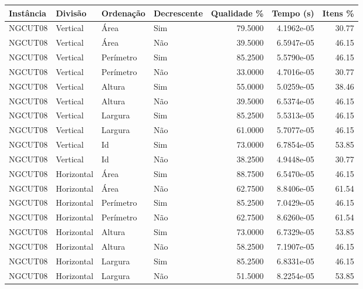 \begin{tabular}{llllrrr}
    \hline
    Instância & Divisão     & Ordenação & Decrescente & Qualidade \% & Tempo (s)  & Itens \% \\
    \hline
    NGCUT08   & Vertical    & Área      & Sim         & 79.5000      & 4.1962e-05 & 30.77    \\
    NGCUT08   & Vertical    & Área      & Não         & 39.5000      & 6.5947e-05 & 46.15    \\
    NGCUT08   & Vertical    & Perímetro & Sim         & 85.2500      & 5.5790e-05 & 46.15    \\
    NGCUT08   & Vertical    & Perímetro & Não         & 33.0000      & 4.7016e-05 & 30.77    \\
    NGCUT08   & Vertical    & Altura    & Sim         & 55.0000      & 5.0259e-05 & 38.46    \\
    NGCUT08   & Vertical    & Altura    & Não         & 39.5000      & 6.5374e-05 & 46.15    \\
    NGCUT08   & Vertical    & Largura   & Sim         & 85.2500      & 5.5313e-05 & 46.15    \\
    NGCUT08   & Vertical    & Largura   & Não         & 61.0000      & 5.7077e-05 & 46.15    \\
    NGCUT08   & Vertical    & Id        & Sim         & 73.0000      & 6.7854e-05 & 53.85    \\
    NGCUT08   & Vertical    & Id        & Não         & 38.2500      & 4.9448e-05 & 30.77    \\
    NGCUT08   & Horizontal  & Área      & Sim         & 88.7500      & 6.5470e-05 & 46.15    \\
    NGCUT08   & Horizontal  & Área      & Não         & 62.7500      & 8.8406e-05 & 61.54    \\
    NGCUT08   & Horizontal  & Perímetro & Sim         & 85.2500      & 7.0429e-05 & 46.15    \\
    NGCUT08   & Horizontal  & Perímetro & Não         & 62.7500      & 8.6260e-05 & 61.54    \\
    NGCUT08   & Horizontal  & Altura    & Sim         & 73.0000      & 6.7329e-05 & 53.85    \\
    NGCUT08   & Horizontal  & Altura    & Não         & 58.2500      & 7.1907e-05 & 46.15    \\
    NGCUT08   & Horizontal  & Largura   & Sim         & 85.2500      & 6.8331e-05 & 46.15    \\
    NGCUT08   & Horizontal  & Largura   & Não         & 51.5000      & 8.2254e-05 & 53.85    \\

\end{tabular}
